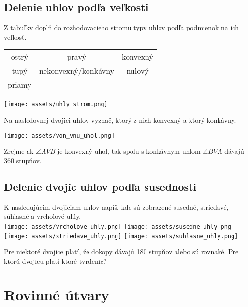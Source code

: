 \documentclass[12pt, twopage]{article}
\theoremstyle{definition}
\begin{document}
	\subsection{Delenie uhlov podľa veľkosti}
	
	Z tabuľky doplň do rozhodovacieho stromu typy uhlov podľa podmienok na ich veľkosť.
	
	\begin{center}
		\begin{tabular}{|ccc|}
			\hline
			ostrý & pravý & konvexný \\
			tupý & nekonvexný/konkávny & nulový \\
			priamy & & \\
			\hline
		\end{tabular}
	\end{center} 
	
	\begin{center}
		 \texttt{[image: assets/uhly\_strom.png]}
	\end{center}
	
	Na nasledovnej dvojici uhlov vyznač, ktorý z nich konvexný a ktorý konkávny. 
	
	\begin{center}
		\texttt{[image: assets/von\_vnu\_uhol.png]}
	\end{center}
	
	Zrejme ak $\angle AVB$ je konvexný uhol, tak spolu s konkávnym uhlom $\angle BVA$ dávajú 360 stupňov.
	
	\subsection{Delenie dvojíc uhlov podľa susednosti}
	
	K nasledujúcim dvojiciam uhlov napíš, kde sú zobrazené susedné, striedavé, súhlasné a vrcholové uhly.\\
	
	\texttt{[image: assets/vrcholove\_uhly.png]}
	\texttt{[image: assets/susedne\_uhly.png]}\\
	\texttt{[image: assets/striedave\_uhly.png]}
	\texttt{[image: assets/suhlasne\_uhly.png]}
	
	Pre niektoré dvojice platí, že dokopy dávajú 180 stupňov alebo sú rovnaké. Pre ktorú dvojicu platí ktoré tvrdenie?
	
	\newpage
	
	\section{Rovinné útvary}
	
\end{document}
